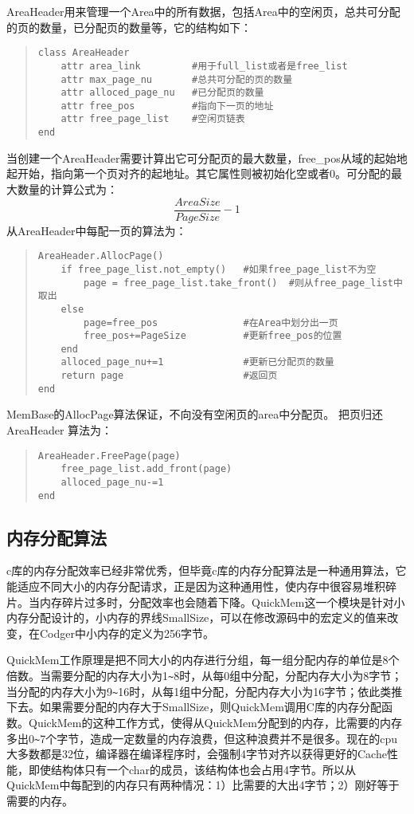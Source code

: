AreaHeader用来管理一个Area中的所有数据，包括Area中的空闲页，总共可分配的页的数量，已分配页的数量等，它的结构如下：
\begin{quote}
\begin{verbatim}
class AreaHeader 
    attr area_link         #用于full_list或者是free_list
    attr max_page_nu       #总共可分配的页的数量
    attr alloced_page_nu   #已分配页的数量
    attr free_pos          #指向下一页的地址
    attr free_page_list    #空闲页链表
end 
\end{verbatim}
\end{quote}
当创建一个AreaHeader需要计算出它可分配页的最大数量，free\_pos从域的起始地起开始，指向第一个页对齐的起地址。其它属性则被初始化空或者0。可分配的最大数量的计算公式为：
\[\frac{AreaSize}{PageSize}-1\]
从AreaHeader中每配一页的算法为：
\begin{quote}
\begin{verbatim}
AreaHeader.AllocPage()
    if free_page_list.not_empty()   #如果free_page_list不为空
        page = free_page_list.take_front()  #则从free_page_list中取出
    else
        page=free_pos               #在Area中划分出一页
        free_pos+=PageSize          #更新free_pos的位置
    end 
    alloced_page_nu+=1              #更新已分配页的数量
    return page                     #返回页
end 
\end{verbatim}
\end{quote}
MemBase的AllocPage算法保证，不向没有空闲页的area中分配页。 把页归还 AreaHeader 算法为：
\begin{quote}
\begin{verbatim}
AreaHeader.FreePage(page)
    free_page_list.add_front(page)
    alloced_page_nu-=1
end 
\end{verbatim}
\end{quote}

\subsection{内存分配算法}
c库的内存分配效率已经非常优秀，但毕竟c库的内存分配算法是一种通用算法，它能适应不同大小的内存分配请求，正是因为这种通用性，使内存中很容易堆积碎片。当内存碎片过多时，分配效率也会随着下降。QuickMem这一个模块是针对小内存分配设计的，小内存的界线SmallSize，可以在修改源码中的宏定义的值来改变，在Codger中小内存的定义为256字节。

QuickMem工作原理是把不同大小的内存进行分组，每一组分配内存的单位是8个倍数。当需要分配的内存大小为1\verb|~|8时，从每0组中分配，分配内存大小为8字节；当分配的内存大小为9\verb|~|16时，从每1组中分配，分配内存大小为16字节；依此类推下去。如果需要分配的内存大于SmallSize，则QuickMem调用C库的内存分配函数。QuickMem的这种工作方式，使得从QuickMem分配到的内存，比需要的内存多出0\verb|~|7个字节，造成一定数量的内存浪费，但这种浪费并不是很多。现在的cpu大多数都是32位，编译器在编译程序时，会强制4字节对齐以获得更好的Cache性能，即使结构体只有一个char的成员，该结构体也会占用4字节。所以从QuickMem中每配到的内存只有两种情况：1）比需要的大出4字节；2）刚好等于需要的内存。

